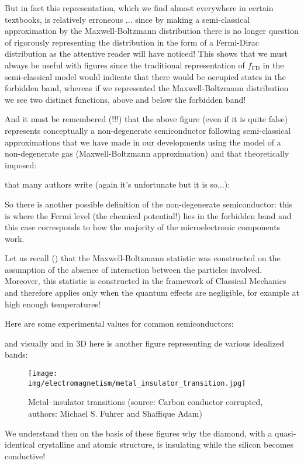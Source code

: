 	But in fact this representation, which we find almost everywhere in certain textbooks, is relatively erroneous ... since by making a semi-classical approximation by the Maxwell-Boltzmann distribution there is no longer question of rigorously representing the distribution in the form of a Fermi-Dirac distribution as the attentive reader will have noticed! This shows that we must always be useful with figures since the traditional representation of $f_{\text{FD}}$ in the semi-classical model would indicate that there would be occupied states in the forbidden band, whereas if we represented the Maxwell-Boltzmann distribution we see two distinct functions, above and below the forbidden band!
	
	And it must be remembered (!!!) that the above figure (even if it is quite false) represents conceptually a non-degenerate semiconductor following semi-classical approximations that we have made in our developments using the model of a non-degenerate gas (Maxwell-Boltzmann approximation) and that theoretically imposed:
	
	that many authors write (again it's unfortunate but it is so...):
	 
	So there is another possible definition of the non-degenerate semiconductor: this is where the Fermi level (the chemical potential!) lies in the forbidden band and this case corresponds to how the majority of the microelectronic components work.
	
	\begin{tcolorbox}[title=Remark,colframe=black,arc=10pt]
	Let us recall () that the Maxwell-Boltzmann statistic was constructed on the assumption of the absence of interaction between the particles involved. Moreover, this statistic is constructed in the framework of Classical Mechanics and therefore applies only when the quantum effects are negligible, for example at high enough temperatures!
	\end{tcolorbox}
	Here are some experimental values for common semiconductors:
	
	and visually and in 3D here is another figure representing de various idealized bands:
	\begin{figure}[H]
		\centering
		\texttt{[image: img/electromagnetism/metal\_insulator\_transition.jpg]}
		\caption{Metal–insulator transitions (source: Carbon conductor corrupted, authors: Michael S. Fuhrer and Shaffique Adam)}
	\end{figure}
	We understand then on the basis of these figures why the diamond, with a quasi-identical crystalline and atomic structure, is insulating while the silicon becomes conductive!

